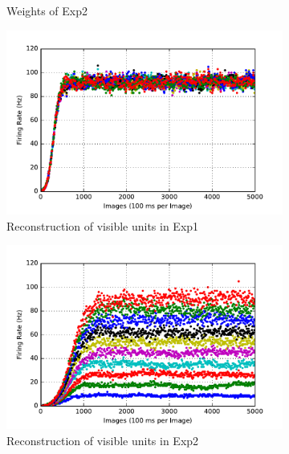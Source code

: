 \begin{figure}
\begin{subfigure}[t]{0.4\textwidth}
		\caption{Weights of Exp2}
	\end{subfigure}
	\begin{subfigure}[t]{0.4\textwidth}
		\includegraphics[width=\textwidth]{pics_sdlm/07_exp_SAE_all_long/exp1_recon_s.pdf}
		\caption{Reconstruction of visible units in Exp1}
	\end{subfigure}
	\begin{subfigure}[t]{0.4\textwidth}
		\includegraphics[width=\textwidth]{pics_sdlm/07_exp_SAE_all_long/exp2_recon_s.pdf}
		\caption{Reconstruction of visible units in Exp2}
	\end{subfigure}\\
	\begin{subfigure}[t]{0.4\textwidth}

\end{subfigure}
\end{figure}
